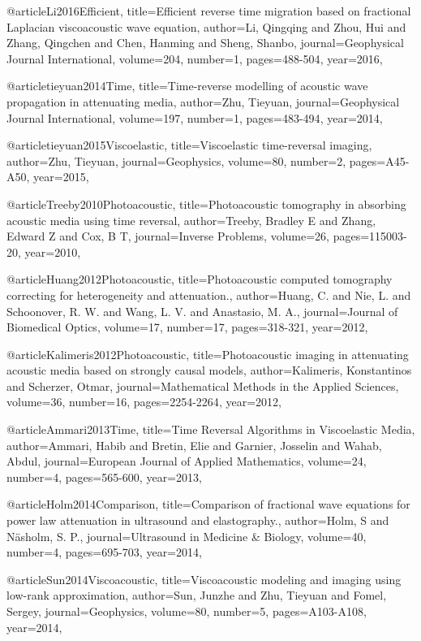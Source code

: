 @article{Li2016Efficient,
  title={Efficient reverse time migration based on fractional {L}aplacian viscoacoustic wave equation},
  author={Li, Qingqing and Zhou, Hui and Zhang, Qingchen and Chen, Hanming and Sheng, Shanbo},
  journal={Geophysical Journal International},
  volume={204},
  number={1},
  pages={488-504},
  year={2016},
}

@article{tieyuan2014Time,
  title={Time-reverse modelling of acoustic wave propagation in attenuating media},
  author={Zhu, Tieyuan},
  journal={Geophysical Journal International},
  volume={197},
  number={1},
  pages={483-494},
  year={2014},
}

@article{tieyuan2015Viscoelastic,
  title={Viscoelastic time-reversal imaging},
  author={Zhu, Tieyuan},
  journal={Geophysics},
  volume={80},
  number={2},
  pages={A45-A50},
  year={2015},
}

@article{Treeby2010Photoacoustic,
  title={Photoacoustic tomography in absorbing acoustic media using time reversal},
  author={Treeby, Bradley E and Zhang, Edward Z and Cox, B T},
  journal={Inverse Problems},
  volume={26},
  pages={115003-20},
  year={2010},
}

@article{Huang2012Photoacoustic,
  title={Photoacoustic computed tomography correcting for heterogeneity and attenuation.},
  author={Huang, C. and Nie, L. and Schoonover, R. W. and Wang, L. V. and Anastasio, M. A.},
  journal={Journal of Biomedical Optics},
  volume={17},
  number={17},
  pages={318-321},
  year={2012},
}

@article{Kalimeris2012Photoacoustic,
  title={Photoacoustic imaging in attenuating acoustic media based on strongly causal models},
  author={Kalimeris, Konstantinos and Scherzer, Otmar},
  journal={Mathematical Methods in the Applied Sciences},
  volume={36},
  number={16},
  pages={2254-2264},
  year={2012},
}

@article{Ammari2013Time,
  title={Time Reversal Algorithms in Viscoelastic Media},
  author={Ammari, Habib and Bretin, Elie and Garnier, Josselin and Wahab, Abdul},
  journal={European Journal of Applied Mathematics},
  volume={24},
  number={4},
  pages={565-600},
  year={2013},
}

@article{Holm2014Comparison,
  title={Comparison of fractional wave equations for power law attenuation in ultrasound and elastography.},
  author={Holm, S and Näsholm, S. P.},
  journal={Ultrasound in Medicine \& Biology},
  volume={40},
  number={4},
  pages={695-703},
  year={2014},
}

@article{Sun2014Viscoacoustic,
  title={Viscoacoustic modeling and imaging using low-rank approximation},
  author={Sun, Junzhe and Zhu, Tieyuan and Fomel, Sergey},
  journal={Geophysics},
  volume={80},
  number={5},
  pages={A103-A108},
  year={2014},
}

